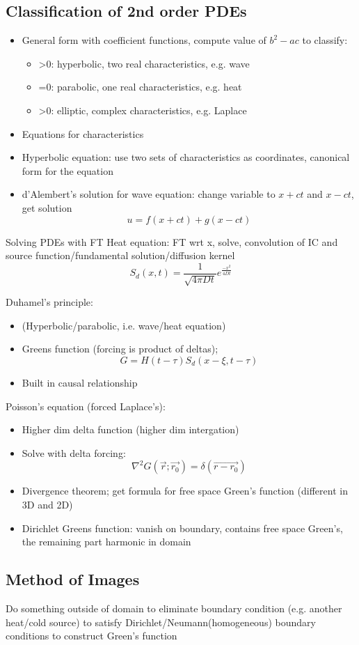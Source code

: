 \subsection*{Classification of 2nd order PDEs}
\begin{itemize}
    \item General form with coefficient functions, compute value of $b^2-ac$ to classify: \\
          \begin{itemize}
              \item >0: hyperbolic, two real characteristics, e.g. wave
              \item =0: parabolic, one real characteristics, e.g. heat
              \item >0: elliptic, complex characteristics, e.g. Laplace
          \end{itemize}
    \item Equations for characteristics
    \item Hyperbolic equation: use two sets of characteristics as coordinates, canonical form for the equation
    \item d'Alembert's solution for wave equation: change variable to $x+ct$ and $x-ct$, get solution \[u = f(x+ct) + g(x-ct)\]

\end{itemize}


Solving PDEs with FT
Heat equation: FT wrt x, solve, convolution of IC and source function/fundamental solution/diffusion kernel \[S_d(x,t)=\frac{1}{\sqrt{4\pi Dt}} e^\frac{-x^2}{4Dt}\]

Duhamel's principle:
\begin{itemize}
    \item (Hyperbolic/parabolic, i.e. wave/heat equation)
    \item Greens function (forcing is product of deltas); \[G=H(t-\tau) S_d(x-\xi,t-\tau)\]
    \item Built in causal relationship
\end{itemize}


Poisson's equation (forced Laplace's):
\begin{itemize}
    \item Higher dim delta function (higher dim intergation)
    \item Solve with delta forcing: \[\nabla^2 G(\vec{r};\vec{r_0}) = \delta(\vec{r-r_0})\]
    \item Divergence theorem; get formula for free space Green's function (different in 3D and 2D)
    \item Dirichlet Greens function: vanish on boundary, contains free space Green's, the remaining part harmonic in domain  
\end{itemize}

\subsection*{Method of Images}
Do something outside of domain to eliminate boundary condition (e.g. another heat/cold source) to satisfy Dirichlet/Neumann(homogeneous) boundary conditions to construct Green's function 


